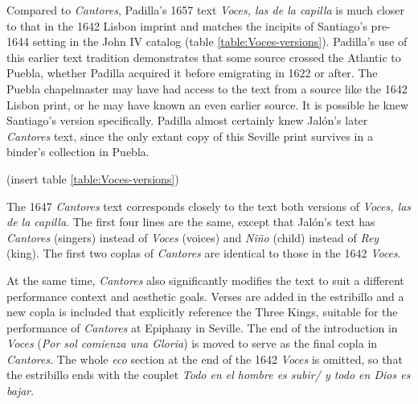 Compared to \emph{Cantores}, Padilla's 1657 text \emph{Voces, las de la capilla} is much
closer to that in the 1642 Lisbon imprint and matches the incipits of Santiago's
pre-1644 setting in the John IV catalog (table \ref{table:Voces-versions}).
Padilla's use of this earlier text tradition demonstrates that some source
crossed the Atlantic to Puebla, whether Padilla acquired it before emigrating in
1622 or after.
The Puebla chapelmaster may have had access to the text from a source like the 1642
Lisbon print, or he may have known an even earlier source.
It is possible he knew Santiago's version specifically.
Padilla almost certainly knew Jalón's later \emph{Cantores} text, since the only
extant copy of this Seville print survives in a binder's collection in Puebla.

(insert table \ref{table:Voces-versions})
\label{table:Voces-versions}

The 1647 \emph{Cantores} text corresponds closely to the text both versions of
\emph{Voces, las de la capilla}.
The first four lines are the same, except that Jalón's text has \emph{Cantores}
(singers) instead of \emph{Voces} (voices) and \emph{Niño} (child) instead of \emph{Rey}
(king).
The first two coplas of \emph{Cantores} are identical to those in the 1642 \emph{Voces}.

At the same time, \emph{Cantores} also significantly modifies the text to suit a
different performance context and aesthetic goals.
Verses are added in the estribillo and a new copla is included that explicitly
reference the Three Kings, suitable for the performance of \emph{Cantores} at
Epiphany in Seville.
The end of the introduction in \emph{Voces} (\emph{Por sol comienza una Gloria}) is
moved to serve as the final copla in \emph{Cantores}.
The whole \emph{eco} section at the end of the 1642 \emph{Voces} is omitted, so that the
estribillo ends with the couplet \emph{Todo en el hombre es subir/ y todo en Dios es
bajar}.

